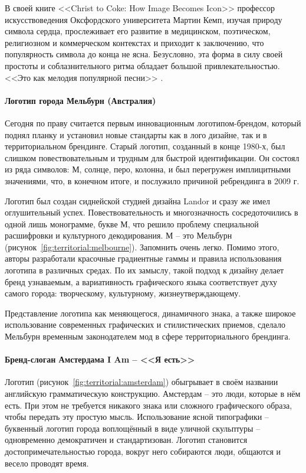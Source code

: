 В своей книге <<Christ to Coke: How Image Becomes Icon>> профессор искусствоведения Оксфордского
университета Мартин Кемп, изучая природу символа сердца, прослеживает его развитие в медицинском,
поэтическом, религиозном и коммерческом контекстах и приходит к заключению, что популярность символа
до конца не ясна. Безусловно, эта форма в силу своей простоты и соблазнительного ритма обладает
большой привлекательностью. <<Это как мелодия популярной песни>> \autocite[][110]{kemp2011christ}.

\paragraph{Логотип города Мельбурн (Австралия)}

Сегодня по праву считается первым инновационным логотипом-брендом, который поднял планку и установил
новые стандарты  как в лого дизайне, так и в территориальном брендинге. Старый логотип, созданный в
конце 1980-х, был слишком повествовательным и трудным для быстрой идентификации. Он состоял из ряда
символов: М, солнце, перо, колонна, и был перегружен имплицитными значениями, что, в конечном итоге,
и послужило причиной ребрендинга в 2009 г.

Логотип был создан сиднейской студией дизайна  Landor  и сразу же имел оглушительный
успех. Повествовательность и многозначность сосредоточились в одной лишь монограмме, букве М, что
решило проблему специальной расшифровки и культурного декодирования. М -- это Мельбурн
(рисунок~\ref{fig:territorial:melbourne}). Запомнить очень легко. Помимо этого, авторы разработали
красочные градиентные гаммы и правила использования логотипа в различных средах. По их замыслу,
такой подход к дизайну делает бренд узнаваемым, а вариативность графического языка соответствует
духу самого города: творческому, культурному, жизнеутверждающему.

Представление логотипа как меняющегося, динамичного знака, а также широкое использование современных
графических и стилистических приемов, сделало Мельбурн временным законодателем мод в сфере
территориального брендинга.

\paragraph{Бренд-слоган Амстердама I Am -- <<Я есть>>}

Логотип (рисунок~\ref{fig:territorial:amsterdam}) обыгрывает в своём названии английскую грамматическую
конструкцию.  Амстердам -- это люди, которые в нём есть. При этом не требуется никакого знака или
сложного графического образа, чтобы передать эту простую мысль. Использование ясной типографики --
буквенный логотип города воплощённый в виде уличной скульптуры -- одновременно демократичен и
стандартизован. Логотип становится достопримечательностью города, вокруг него собираются люди,
общаются и весело проводят время.

